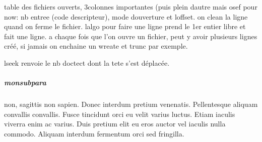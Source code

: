 \documentclass{report}
\begin{document}
table des fichiers ouverts, 3colonnes importantes (puis plein dautre mais osef pour now:
nb entree (code descripteur), mode douverture et loffset.
on clean la ligne quand on ferme le fichier.
lalgo pour faire une ligne prend le 1er entier libre et fait une ligne.
a chaque fois que l'on ouvre un fichier, peut y avoir plusieurs lignes créé, si jamais on enchaine un wreate et trunc par exemple.

lseek renvoie le nb doctect dont la tete s'est déplacée.
\subparagraph{monsubpara}
 non, sagittis non sapien.
Donec interdum pretium venenatis. Pellentesque aliquam convallis convallis.
Fusce tincidunt orci eu velit varius luctus. Etiam iaculis viverra enim ac varius.
Duis pretium elit eu eros auctor vel iaculis nulla commodo. Aliquam interdum fermentum orci sed fringilla.
\end{document}
